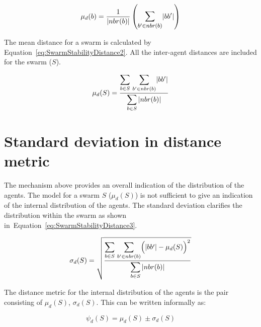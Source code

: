 \documentclass[10pt,journal,letterpaper,twoside]{IEEEtran}
\begin{document}
\begin{equation}
\label{eq:SwarmStabilityDistance1}
\mu_d(b) = \frac{1}{\mathlarger{|nbr(b)|}}\left({\mathlarger{\sum_{b' \in nbr(b)}}|bb'|}\right)
\end{equation}

The mean distance for a swarm is calculated by Equation~\ref{eq:SwarmStabilityDistance2}. All the inter-agent distances are included for the swarm ($S$). 


\begin{equation}
\label{eq:SwarmStabilityDistance2}
\mu_d(S) = \frac{\mathlarger{\sum_{b \in S}}~\mathlarger{\sum_{b' \in nbr(b)}}|bb'|}{\mathlarger{\sum_{b \in S}|nbr(b)|}}
\end{equation}

\section{Standard deviation in distance metric}\label{Section:VarianceInDistance}
The mechanism above provides an overall indication of the distribution of the agents. The model for a swarm $S$ ($\mu_d(S)$) is not sufficient to give an indication of the internal distribution of the agents. The standard deviation clarifies the distribution within the swarm as shown in~Equation~\ref{eq:SwarmStabilityDistance3}. 


\begin{equation}
\label{eq:SwarmStabilityDistance3}
\sigma_d(S) = \sqrt{\frac{\mathlarger{\sum_{b \in S}}~\mathlarger{\sum_{b' \in nbr(b)}}\Big(|bb'| - \mu_d(S)\Big)^2}{\mathlarger{\sum_{b \in S}|nbr(b)|}}}
\end{equation}

The distance metric for the internal distribution of the agents is the pair consisting of $\mu_d(S)$, $\sigma_d(S)$. This can be written informally as:

\begin{equation}
\label{eq:SwarmPotentialMagnitude}
\psi_d(S) = \mu_d(S)\pm \sigma_d(S)
\end{equation}
\end{document}
